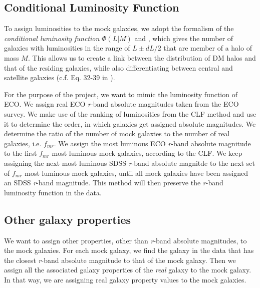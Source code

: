 \documentclass[a4paper, 11pt]{article}
\newcommand{\rband}{\textit{r}-band }
\begin{document}
\subsection{Conditional Luminosity Function}\label{sub:clf}
To assign luminosities to the mock galaxies, we adopt the formalism of the 
\textit{conditional luminosity function} $\Phi (L|M)$ 
\citep[CLF;][]{Yang2003, VanDenBosch2003} and 
\cite[;][]{Cacciato2009}, which 
gives the number of galaxies with luminosities in the range of 
$L \pm dL/2$ that are member of a halo of mass $M$. This allows us to 
create a link between the distribution of DM halos and that of the 
residing galaxies, while also differentiating between central and 
satellite galaxies (c.f. Eq. 32-39 in ).

For the purpose of the project, we want to mimic the luminosity function of 
ECO. We assign real ECO \rband absolute magnitudes taken from the 
ECO survey. We make use of the ranking of luminosities from the 
CLF method and use it to determine the order, in which galaxies get 
assigned absolute magnitudes. We determine the ratio of the number 
of mock galaxies to the number of real galaxies, i.e. $f_{mr}$.
We assign the most luminous ECO \rband absolute magnitude to the 
first $f_{mr}$ most luminous mock galaxies, according to the CLF. We 
keep assigning the next most luminous SDSS \rband absolute magnitde 
to the next set of $f_{mr}$ most luminous mock galaxies, until all 
mock galaxies have been assigned an SDSS \rband magnitude. This method 
will then preserve the \rband luminosity function in the data.

\subsection{Other galaxy properties}\label{sub:other_prop}
We want to assign other properties, other than \rband absolute magnitudes, 
to the mock galaxies. For each mock galaxy, we find the galaxy in the data 
that has the closest \rband absolute magnitude to that of the mock galaxy.
Then we assign all the associated galaxy properties of the \textit{real} 
galaxy to the mock galaxy. In that way, we are assigning real galaxy property 
values to the mock galaxies.

\end{document}
